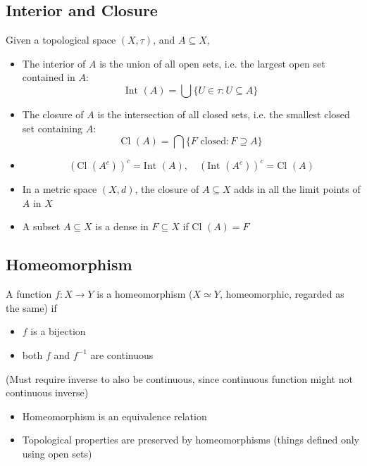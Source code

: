 \subsection*{Interior and Closure}
Given a topological space $(X,\tau)$, and $A \subseteq X$,

\begin{itemize}
    \item The interior of $A$ is the union of all open sets, i.e. the largest open set contained in $A$: \[\text{Int } (A) = \bigcup \{ U \in \tau : U \subseteq A\}\]
    \item The closure of $A$ is the intersection of all closed sets, i.e. the smallest closed set containing $A$: \[ \text{Cl } (A) = \bigcap \{ F \text{ closed} : F \supseteq A \}\]
    \item \[(\text{Cl } (A^c))^c = \text{Int } (A), \quad (\text{Int } (A^c))^c = \text{Cl } (A)\]
    \item In a metric space $(X,d)$, the closure of $A \subseteq X$ adds in all the limit points of $A$ in $X$
    \item A subset $A \subseteq X$ is a dense in $F \subseteq X$ if $\text{Cl } (A) = F$
\end{itemize}

\subsection*{Homeomorphism}

A function $f : X \to Y$ is a homeomorphism ($X \simeq Y$, homeomorphic, regarded as the same) if
\begin{itemize}
    \item $f$ is a bijection
    \item both $f$ and $f^{-1}$ are continuous
\end{itemize}

(Must require inverse to also be continuous, since continuous function might not continuous inverse)

\begin{itemize}
    \item Homeomorphism is an equivalence relation
    \item Topological properties are preserved by homeomorphisms (things defined only using open sets)
\end{itemize}

